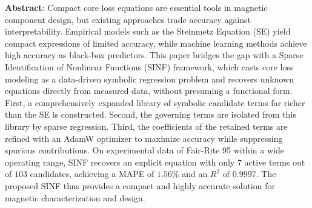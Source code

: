 \vspace{-1em}
\textbf{Abstract}: 
Compact core loss equations are essential tools in magnetic component design, but existing approaches trade accuracy against interpretability. Empirical models such as the Steinmetz Equation (SE) yield compact expressions of limited accuracy, while machine learning methods achieve high accuracy as black-box predictors. This paper bridges the gap with a Sparse Identification of Nonlinear Functions (SINF) framework, which casts core loss modeling as a data-driven symbolic regression problem and recovers unknown equations directly from measured data, without presuming a functional form. First, a comprehensively expanded library of symbolic candidate terms far richer than the SE is constructed. Second, the governing terms are isolated from this library by sparse regression. Third, the coefficients of the retained terms are refined with an AdamW optimizer to maximize accuracy while suppressing spurious contributions. On experimental data of Fair-Rite 95 within a wide operating range, SINF recovers an explicit equation with only $7$ active terms out of $103$ candidates, achieving a MAPE of $1.56\%$ and an $R^2$ of $0.9997$. The proposed SINF thus provides a compact and highly accurate solution for magnetic characterization and design.


